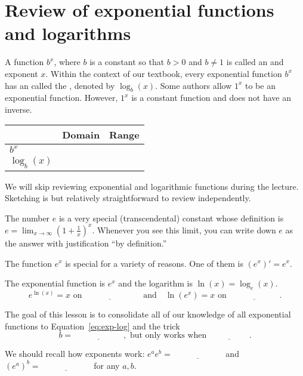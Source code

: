 \documentclass[../main.tex]{subfiles}
\begin{document}
 \section{Review of exponential functions and logarithms}
A function \(b^{x}\), where \(b\) is a constant so that \(b > 0\) and \(b \ne 1\) is called an  and exponent \(x\). Within the context of our textbook, every exponential function \(b^{x}\) has an  called the , denoted by \(\log_{b}(x)\). \newline
{\scriptsize Some authors allow \(1^{x}\) to be an exponential function. However, \(1^{x}\) is a constant function and does not have an inverse.}

\begin{center}
  \begin{tabular}{l|p{1in}|p{1in}}
    & Domain & Range \\\midrule
    \(b^{x}\) & & \\\midrule
    \(\log_{b}(x)\) & &
  \end{tabular}
\end{center}

\faExclamationTriangle{} We will skip reviewing  exponential and logarithmic functions during the lecture. Sketching is  but relatively straightforward to review independently.


The number \(e\) is a very special (transcendental) constant whose definition is \(e = \lim_{x \to \infty} \left( 1 + \frac{1}{x} \right)^{x}\). Whenever you see this limit, you can write down \(e\) as the answer with justification ``by definition.''
\bigskip

The function \(e^{x}\) is special for a variety of reasons. One of them is \((e^{x})' = e^{x}\).
\begin{mdframed}[style=simple]
  The  exponential function is \(e^{x}\) and the  logarithm is \(\ln(x) = \log_{e}(x)\).
  \begin{equation} \label{eq:exp-log}
    e^{\ln(x)} = x \text{ on } \underline{\hspace{1in}} \quad\text{and}\quad \ln(e^{x}) = x \text{ on } \underline{\hspace{1in}}.
  \end{equation}

  The goal of this lesson is to consolidate all of our knowledge of all exponential functions to Equation~\eqref{eq:exp-log} and the  trick
  \begin{equation} \label{eq:exp-change-of-base}
    b = \underline{\hspace{1in}}, \text{ but only works when } \underline{\hspace{2cm}}.
  \end{equation}
\end{mdframed}
We should recall how exponents work: \(e^{a}e^{b} = \underline{\hspace{1in}}\) and \((e^{a})^{b} = \underline{\hspace{1in}}\) for any \(a,b\).
\end{document}
